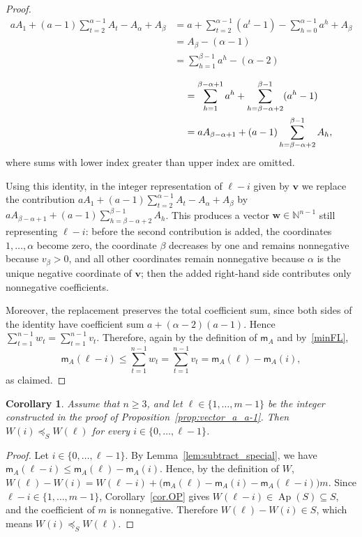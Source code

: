 \documentclass[12pt,a4paper]{amsart}
\newtheorem{corollary}[theorem]{Corollary}
\theoremstyle{definition}
\begin{document}
\begin{proof}
\[
\begin{aligned}
aA_1+(a-1)\sum_{t=2}^{\alpha-1}A_t-A_\alpha+A_\beta
&=
a+\sum_{t=2}^{\alpha-1}(a^t-1)-\sum_{h=0}^{\alpha-1}a^h+A_\beta \\
&=
A_\beta-(\alpha-1) \\
&=
\sum_{h=1}^{\beta-1}a^h-(\alpha-2) \\
\end{aligned}\]
\[\begin{aligned}
 \hspace{5.6cm}   &=
\sum_{h=1}^{\beta-\alpha+1}a^h
+
\sum_{h=\beta-\alpha+2}^{\beta-1}(a^h-1) \\
&=
aA_{\beta-\alpha+1}
+
(a-1)\sum_{h=\beta-\alpha+2}^{\beta-1}A_h,
\end{aligned}
\]
where sums with lower index greater than upper index are omitted.

Using this identity, in the integer representation of $\ell-i$ given by $\mathbf v$ we replace the contribution
$aA_1+(a-1)\sum_{t=2}^{\alpha-1}A_t-A_\alpha+A_\beta$
by $aA_{\beta-\alpha+1} + (a-1)\sum_{h=\beta-\alpha+2}^{\beta-1}A_h$. This produces a vector $\mathbf w\in\mathbb N^{n-1}$ still representing
$\ell-i$: before the second contribution is added, the coordinates
$1,\ldots,\alpha$ become zero, the coordinate $\beta$ decreases by one and
remains nonnegative because $v_\beta>0$, and all other coordinates remain
nonnegative because $\alpha$ is the unique negative coordinate of $\mathbf v$;
then the added right-hand side contributes only nonnegative coefficients.

Moreover, the replacement preserves the total coefficient sum, since both sides
of the identity have coefficient sum $a+(\alpha-2)(a-1)$. Hence
$\sum_{t=1}^{n-1}w_t=\sum_{t=1}^{n-1}v_t$. Therefore, again by the definition of $\mathsf m_A$ and by~\eqref{minFL},
\[
\mathsf m_A(\ell-i)
\le
\sum_{t=1}^{n-1}w_t
=
\sum_{t=1}^{n-1}v_t
=
\mathsf m_A(\ell)-\mathsf m_A(i),
\]
as claimed.
\end{proof}

\begin{corollary}\label{cor:32}
Assume that $n\ge 3$, and let $\ell\in\{1,\ldots,m-1\}$ be the integer constructed in the proof of
Proposition~\ref{prop:vector_a_a-1}. Then
$W(i)\preceq_S W(\ell)$ for every $i\in\{0,\ldots,\ell-1\}$.
\end{corollary}

\begin{proof}
Let $i\in\{0,\ldots,\ell-1\}$. By Lemma~\ref{lem:subtract_special}, we have
$\mathsf{m}_A(\ell-i)\le \mathsf{m}_A(\ell)-\mathsf{m}_A(i)$. Hence, by the definition of $W$,
$W(\ell)-W(i)=W(\ell-i)+\bigl(\mathsf{m}_A(\ell)-\mathsf{m}_A(i)-\mathsf{m}_A(\ell-i)\bigr)m$.
Since $\ell-i\in\{1,\ldots,m-1\}$, Corollary~\ref{cor.OP} gives
$W(\ell-i)\in\operatorname{Ap}(S)\subseteq S$, and the coefficient of $m$ is nonnegative.
Therefore $W(\ell)-W(i)\in S$, which means $W(i)\preceq_S W(\ell)$.
\end{proof}
\end{document}

